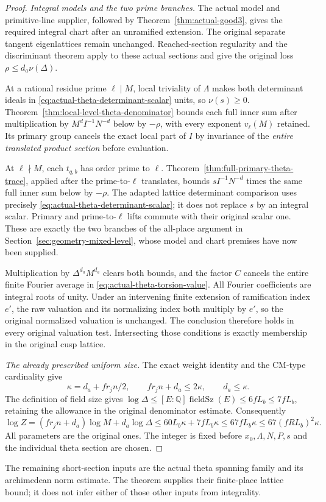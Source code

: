 \begin{proof}
\emph{Integral models and the two prime branches.}
The actual model and primitive-line supplier, followed by
Theorem~\ref{thm:actual-good3}, gives the required integral chart
after an unramified extension.  The original separate tangent
eigenlattices remain unchanged.  Reached-section regularity and
the discriminant theorem apply to these actual sections and give
the original loss $\rho\le d_a\nu(\Delta)$.

At a rational residue prime $\ell\mid M$, local triviality of
$\Lambda$ makes both determinant ideals in
\eqref{eq:actual-theta-determinant-scalar} units, so $\nu(s)\ge0$.
Theorem~\ref{thm:local-level-theta-denominator} bounds each full
inner sum after multiplication by $M^d I^{-1}N^{-d}$ below by
$-\rho$, with every exponent $v_\ell(M)$ retained.  Its primary
group cancels the exact local part of $I$ by invariance of the
\emph{entire translated product section} before evaluation.

At $\ell\nmid M$, each $t_{q,b}$ has order prime to $\ell$.
Theorem~\ref{thm:full-primary-theta-trace}, applied after the
prime-to-$\ell$ translates, bounds
$sI^{-1}N^{-d}$ times the same full inner sum below by $-\rho$.
The adapted lattice determinant comparison uses precisely
\eqref{eq:actual-theta-determinant-scalar}; it does not replace
$s$ by an integral scalar.  Primary and prime-to-$\ell$ lifts
commute with their original scalar one.  These are exactly the
two branches of the all-place argument in
Section~\ref{sec:geometry-mixed-level}, whose model and chart
premises have now been supplied.

Multiplication by $\Delta^{d_a}M^{d_a}$ clears both bounds, and
the factor $C$ cancels the entire finite Fourier average in
\eqref{eq:actual-theta-torsion-value}.  All Fourier coefficients
are integral roots of unity.  Under an intervening finite
extension of ramification index $e'$, the raw valuation and its
normalizing index both multiply by $e'$, so the original
normalized valuation is unchanged.  The conclusion therefore
holds in every original valuation test.  Intersecting those
conditions is exactly membership in the original cusp lattice.

\emph{The already prescribed uniform size.}
The exact weight identity and the CM-type cardinality give
\[
 \kappa=d_a+f r_j n/2,
 \qquad f r_j n+d_a\le2\kappa,
 \qquad d_a\le\kappa.
\]
The definition of field size gives
$\log\Delta\le[E:\mathbb Q]\operatorname{fieldSz}(E)
\le6fL_b\le7fL_b$, retaining the allowance in the original
denominator estimate.
Consequently
\[
 \log Z
  =(f r_j n+d_a)\log M+d_a\log\Delta
  \le60L_b\kappa+7fL_b\kappa
  \le67fL_b\kappa
  \le67(fRL_b)^2\kappa.
\]
All parameters are the original ones.  The integer is fixed before
$x_0,\Lambda,N,P,s$ and the individual theta section are chosen.
\end{proof}

The remaining short-section inputs are the actual theta spanning
family and its archimedean norm estimate.  The theorem supplies their
finite-place lattice bound; it does not infer either of those other
inputs from integrality.
